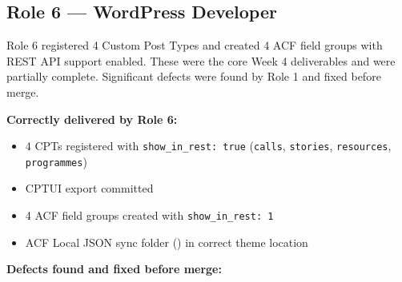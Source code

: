 \documentclass[12pt,a4paper]{article}
\begin{document}
\subsection{Role 6 --- WordPress Developer}

Role 6 registered 4 Custom Post Types and created 4 ACF field groups with
REST API support enabled. These were the core Week 4 deliverables and were
partially complete. Significant defects were found by Role 1 and fixed before
merge.

\vspace{0.8em}
\noindent\textbf{Correctly delivered by Role 6:}

\begin{itemize}
    \item 4 CPTs registered with \texttt{show\_in\_rest: true}
          (\texttt{calls}, \texttt{stories}, \texttt{resources},
          \texttt{programmes})
    \item CPTUI export committed
    \item 4 ACF field groups created with \texttt{show\_in\_rest: 1}
    \item ACF Local JSON sync folder () in correct theme
          location
\end{itemize}

\vspace{0.6em}
\noindent\textbf{Defects found and fixed before merge:}
\vspace{0.4em}
\end{document}
